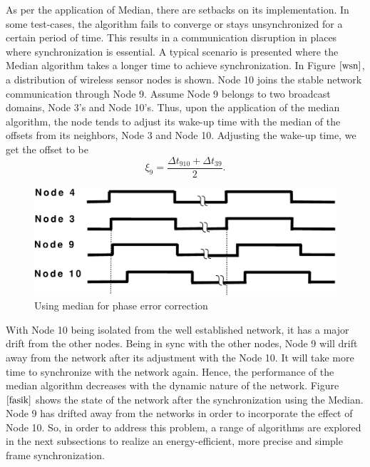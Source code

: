 \documentclass[a4paper,10pt]{report}
\begin{document}
\newline As per the application of Median, there are setbacks on its implementation. In some test-cases, the algorithm fails to converge or stays unsynchronized for a certain period of time. This results in a  communication disruption in places where synchronization is essential.
\newline A typical scenario is presented where the Median algorithm takes a longer time to achieve synchronization. In Figure
$\ref{wsn}$, a distribution of wireless sensor nodes is shown. Node 10 joins the stable network communication through Node 9. Assume Node
9 belongs to two broadcast domains, Node 3's and Node 10's. Thus, upon the application of the median algorithm, the node tends to
adjust its wake-up time with the median of the offsets from its neighbors, Node 3 and Node 10. Adjusting the wake-up time, we get
the offset to be 
\begin{equation}
\xi_9 = \frac{\Delta t_{910} + \Delta t_{39}}{2}.
\end{equation}
\begin{figure}
\centering
\includegraphics[width= 0.75 \textwidth]{offsetpic}
\caption{Using median for phase error correction} \label{fasik}
\end{figure}
\noindent 
With Node 10 being isolated from the well established network, it has a major drift from the other nodes. Being in sync
with the other nodes, Node 9 will drift away from the network after its adjustment with the Node 10. It will take more time to
synchronize with the network again. Hence, the performance of the median algorithm decreases with the dynamic nature of the network.
Figure $\ref{fasik}$ shows the state of the network after the synchronization using the Median. Node 9 has drifted away from the
networks in order to incorporate the effect of Node 10.
\newline So, in order to address this problem, a range of algorithms are explored in the next subsections to realize an
energy-efficient, more precise and simple frame synchronization.\newline
\end{document}
